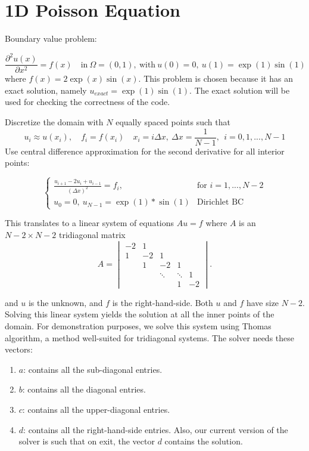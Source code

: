 \section{1D Poisson Equation}

Boundary value problem:

\begin{equation} 
  \frac{\partial^2 u(x)}{\partial x^2} = f(x) \quad 
  \text{in} \ \Omega=(0,1), \ \text{with} 
  \ u(0)=0, \ u(1)=\exp{(1)}\sin{(1)}
\end{equation} 
where $f(x)=2\exp{(x)}\sin{(x)}$. This problem is chosen because 
it has an exact solution, namely $u_{exact} = \exp{(1)}\sin{(1)}$. 
The exact solution will be used for checking the correctness 
of the code.

Discretize the domain with $N$ equally spaced points such that 
\begin{equation}
u_i \approx u(x_i), \quad f_i=f(x_i) 
\quad x_i = i \Delta x, \ \Delta x=\frac{1}{N-1}, \ \ i=0,1,...,N-1
\end{equation}
Use central difference approximation for the second derivative 
for all interior points:
\begin{large}
\begin{equation}
\begin{cases}
  \frac{u_{i+1} - 2u_i + u_{i-1}}{(\Delta x)^2}=f_i, & \text{for } i=1,...,N-2 \\
    u_0=0, \ u_{N-1}=\exp{(1)}*\sin{(1)} & \text{Dirichlet BC}
\end{cases}  
\end{equation}
\end{large}

This translates to a linear system of equations $Au=f$ 
where $A$ is an $N-2 \times N-2$ tridiagonal matrix 
\begin{equation}
A = \begin{vmatrix}
-2 & 1 \\
1 & -2 & 1 \\
& 1 & -2 & 1 \\
& & \ddots & \ddots & 1 \\
& & & 1 & -2
\end{vmatrix}.
\end{equation}

and $u$ is the unknown, and $f$ is the right-hand-side. 
Both $u$ and $f$ have size $N-2$. 
Solving this linear system yields the solution at all the inner 
points of the domain. For demonstration purposes, we solve 
this system using Thomas algorithm, a method well-suited 
for tridiagonal systems. 
The solver needs these vectors:
\begin{enumerate}
\item $a$: contains all the sub-diagonal entries. 
\item $b$: contains all the diagonal entries. 
\item $c$: contains all the upper-diagonal entries. 
\item $d$: contains all the right-hand-side entries. 
Also, our current version of the solver is 
such that on exit, the vector $d$ contains the solution.
\end{enumerate}


